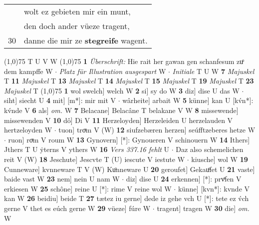 \documentclass[8pt,a4paper,notitlepage]{article}
\begin{document}
\begin{table}[ht]
\begin{minipage}[t]{0.5\linewidth}
\begin{tabular}{rl}
 & wolt ez gebieten mir ein munt,\\ 
 & den doch ander vüeze tragent,\\ 
30 & danne die mir ze \textbf{stegreife} wagent.\\ 
\end{tabular}
\scriptsize
\line(1,0){75} \newline
T U V W \newline
\line(1,0){75} \newline
\textbf{1} \textit{Überschrift:} Hie rait her gawan gen schanfesum zuͦ dem kampffe W   $\cdot$ \textit{Platz für Illustration ausgespart} W   $\cdot$ \textit{Initiale} T U W  \textbf{7} \textit{Majuskel} T  \textbf{11} \textit{Majuskel} T  \textbf{13} \textit{Majuskel} T  \textbf{14} \textit{Majuskel} T  \textbf{15} \textit{Majuskel} T  \textbf{19} \textit{Majuskel} T  \textbf{23} \textit{Majuskel} T  \newline
\line(1,0){75} \newline
\textbf{1} wol swelch] welch W \textbf{2} si] sy do W \textbf{3} diz] dise U das W  $\cdot$ siht] siecht U \textbf{4} mit] [m*]: mir mit V  $\cdot$ wârheite] arbait W \textbf{5} künne] kan U [kv́n*]: kv́nde V \textbf{6} als] \textit{om.} W \textbf{7} Belacane] Belacâne T belakane V W \textbf{8} missewende] missewenden V \textbf{10} dô] Di V \textbf{11} Herzeloyden] Herzeleiden U herzelauden V hertzeloyden W  $\cdot$ tuon] troͮm V (W) \textbf{12} siufzebæren herzen] seúfftzeberes hetze W  $\cdot$ ruon] roͮm V roum W \textbf{13} Gynovern] [*]: Gynoueren V schinouern W \textbf{14} Ithers] Jthers T U ẏterns V ythers W \textbf{16} \textit{Vers 337.16 fehlt} U   $\cdot$ Daz also schemelichen reit V (W) \textbf{18} Jeschute] Jescvte T (U) iescute V iestute W  $\cdot$ kiusche] wol W \textbf{19} Cunneware] kvnneware T V (W) Kuͦnneware U \textbf{20} geroufet] Gekauͦfet U \textbf{21} vaste] baide vast W \textbf{23} nem] nein U nam W  $\cdot$ diz] dise U \textbf{24} erkennen] [*]: prvͤfen V erkiesen W \textbf{25} schône] reine U [*]: rime V reine wol W  $\cdot$ künne] [kvn*]: kvnde V kan W \textbf{26} beidiu] beide T \textbf{27} tætez iu gerne] dede iz gehe vch U [*]: tete ez v́ch gerne V thet es eúch gerne W \textbf{29} vüeze] fúre W  $\cdot$ tragent] tragen W \textbf{30} die] \textit{om.} W \newline
\end{minipage}
\end{table}
\end{document}
